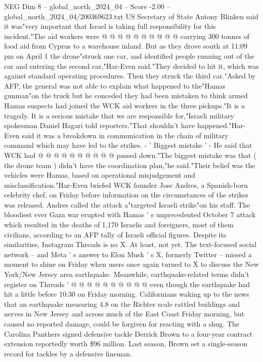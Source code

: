\begin{textsample}{NEG Dim 8 – global\_north\_2024\_04 – Score -2.00 – global\_north\_2024\_04/200369623.txt}
US Secretary of State Antony Blinken said it was"very important that Israel is taking full responsibility for this incident."The aid workers were @ @ @ @ @ @ @ @ @ @ carrying 300 tonnes of food aid from Cyprus to a warehouse inland.
But as they drove south at 11:09 pm on April 1 the drone"struck one car, and identified people running out of the car and entering the second car,"Har-Even said."They decided to hit it, which was against standard operating procedures.
Then they struck the third car."Asked by AFP, the general was not able to explain what happened to the"Hamas gunman"on the truck but he conceded they had been mistaken to think armed Hamas suspects had joined the WCK aid workers in the three pickups."It is a tragedy.
It is a serious mistake that we are responsible for,"Israeli military spokesman Daniel Hagari told reporters."That shouldn't have happened."Har-Even said it was a breakdown in communication in the chain of military command which may have led to the strikes. - ' Biggest mistake ' - He said that WCK had @ @ @ @ @ @ @ @ @ @ passed down."The biggest mistake was that ( the drone team ) didn't have the coordination plan,"he said."Their belief was the vehicles were Hamas, based on operational misjudgement and misclassification."Har-Even briefed WCK founder Jose Andres, a Spanish-born celebrity chef, on Friday before information on the circumstances of the strikes was released.
Andres called the attack a"targeted Israeli strike"on his staff.
The bloodiest ever Gaza war erupted with Hamas ' s unprecedented October 7 attack which resulted in the deaths of 1,170 Israelis and foreigners, most of them civilians, according to an AFP tally of Israeli official figures.
Despite its similarities, Instagram Threads is no X.
At least, not yet.
The text-focused social network -- and Meta ' s answer to Elon Musk ' s X, formerly Twitter -- missed a moment to shine on Friday when users once again turned to X to discuss the New York/New Jersey area earthquake.
Meanwhile, earthquake-related terms didn't register on Threads ' @ @ @ @ @ @ @ @ @ @ even though the earthquake had hit a little before 10:30 on Friday morning.
Californians waking up to the news that an earthquake measuring 4.8 on the Richter scale rattled buildings and nerves in New Jersey and across much of the East Coast Friday morning, but caused no reported damage, could be forgiven for reacting with a shug.
The Carolina Panthers signed defensive tackle Derrick Brown to a four-year contract extension reportedly worth \$96 million.
Last season, Brown set a single-season record for tackles by a defensive lineman.

\end{textsample}
